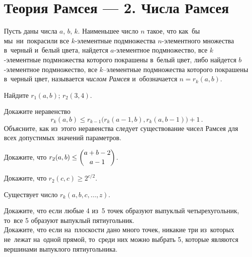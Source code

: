 
\section*{Теория Рамсея --- 2. Числа Рамсея}


Пусть даны числа $a$, $b$, $k$.
Наименьшее число $n$ такое, что как~бы мы~ни~покрасили все
$k$-элементные подмножества $n$-элементного множества в~черный и~белый цвета,
найдется $a$-элементное подмножество, все $k$-элементные подмножества
которого покрашены в~белый цвет, либо найдется $b$-элементное подмножество,
все $k$--элементные подмножества которого покрашены в~черный цвет, называется
\emph{числом Рамсея} и~обозначается $n = r_k(a, b)$.

\begin{problems}

\item
Найдите
\quad
\subproblem $r_1(a, b)$;
\quad
\subproblem $r_2(3, 4)$.

\item
Докажите неравенство
\[
    r_{k}(a, b)
\leq
    r_{k-1} \bigl( r_{k}(a - 1, b), r_k(a, b - 1) \bigr) + 1
\,.\]
Объясните, как из~этого неравенства следует существование чисел Рамсея для всех
допустимых значений параметров. 

\item
Докажите, что
\(
    r_2(a, b) \leq \dbinom{a + b - 2}{a - 1}
\)\;. 

\item
Докажите, что $r_2(c, c) \geq 2^{c / 2}$. 

\item{}
Существует число $r_k(a, b, c, \ldots, z)$.  


\item{}
\subproblem
Докажите, что если любые 4 из~5 точек образуют выпуклый четырехугольник,
то~все 5 образуют выпуклый пятиугольник.
\\
\subproblem
Докажите, что если на~плоскости дано много точек, никакие три из~которых
не~лежат на~одной прямой, то~среди них можно выбрать 5, которые являются
вершинами выпуклого пятиугольника.

\end{problems}

